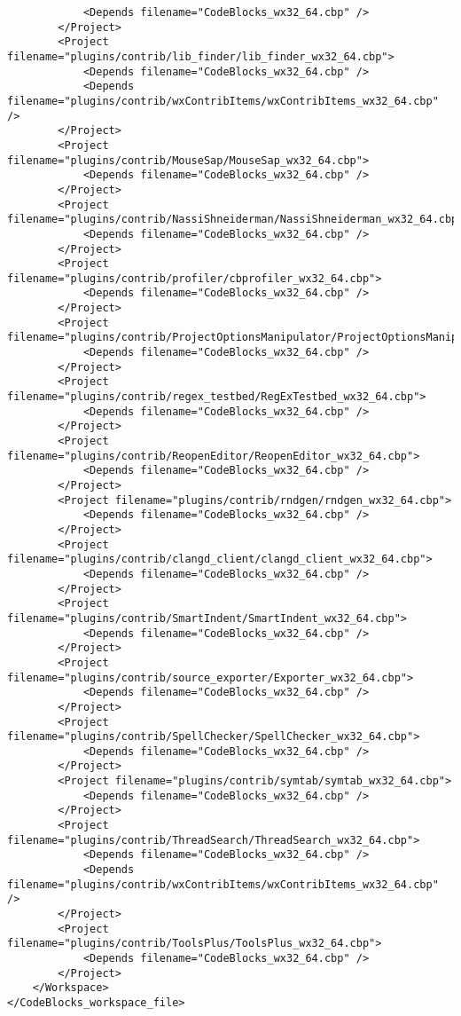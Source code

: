 {\begin{verbatim}
			<Depends filename="CodeBlocks_wx32_64.cbp" />
		</Project>
		<Project filename="plugins/contrib/lib_finder/lib_finder_wx32_64.cbp">
			<Depends filename="CodeBlocks_wx32_64.cbp" />
			<Depends filename="plugins/contrib/wxContribItems/wxContribItems_wx32_64.cbp" />
		</Project>
		<Project filename="plugins/contrib/MouseSap/MouseSap_wx32_64.cbp">
			<Depends filename="CodeBlocks_wx32_64.cbp" />
		</Project>
		<Project filename="plugins/contrib/NassiShneiderman/NassiShneiderman_wx32_64.cbp">
			<Depends filename="CodeBlocks_wx32_64.cbp" />
		</Project>
		<Project filename="plugins/contrib/profiler/cbprofiler_wx32_64.cbp">
			<Depends filename="CodeBlocks_wx32_64.cbp" />
		</Project>
		<Project filename="plugins/contrib/ProjectOptionsManipulator/ProjectOptionsManipulator_wx32_64.cbp">
			<Depends filename="CodeBlocks_wx32_64.cbp" />
		</Project>
		<Project filename="plugins/contrib/regex_testbed/RegExTestbed_wx32_64.cbp">
			<Depends filename="CodeBlocks_wx32_64.cbp" />
		</Project>
		<Project filename="plugins/contrib/ReopenEditor/ReopenEditor_wx32_64.cbp">
			<Depends filename="CodeBlocks_wx32_64.cbp" />
		</Project>
		<Project filename="plugins/contrib/rndgen/rndgen_wx32_64.cbp">
			<Depends filename="CodeBlocks_wx32_64.cbp" />
		</Project>
		<Project filename="plugins/contrib/clangd_client/clangd_client_wx32_64.cbp">
			<Depends filename="CodeBlocks_wx32_64.cbp" />
		</Project>
		<Project filename="plugins/contrib/SmartIndent/SmartIndent_wx32_64.cbp">
			<Depends filename="CodeBlocks_wx32_64.cbp" />
		</Project>
		<Project filename="plugins/contrib/source_exporter/Exporter_wx32_64.cbp">
			<Depends filename="CodeBlocks_wx32_64.cbp" />
		</Project>
		<Project filename="plugins/contrib/SpellChecker/SpellChecker_wx32_64.cbp">
			<Depends filename="CodeBlocks_wx32_64.cbp" />
		</Project>
		<Project filename="plugins/contrib/symtab/symtab_wx32_64.cbp">
			<Depends filename="CodeBlocks_wx32_64.cbp" />
		</Project>
		<Project filename="plugins/contrib/ThreadSearch/ThreadSearch_wx32_64.cbp">
			<Depends filename="CodeBlocks_wx32_64.cbp" />
			<Depends filename="plugins/contrib/wxContribItems/wxContribItems_wx32_64.cbp" />
		</Project>
		<Project filename="plugins/contrib/ToolsPlus/ToolsPlus_wx32_64.cbp">
			<Depends filename="CodeBlocks_wx32_64.cbp" />
		</Project>
	</Workspace>
</CodeBlocks_workspace_file>
\end{verbatim}
}


